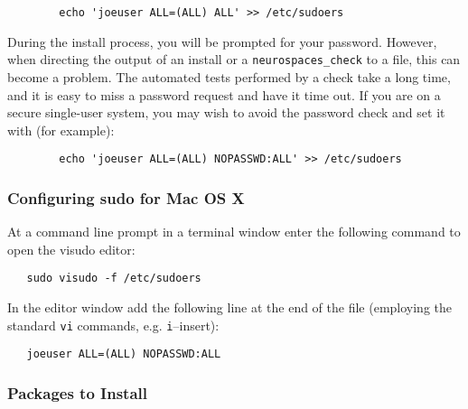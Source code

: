 \documentclass[12pt]{article}
\begin{document}
\begin{verbatim}
        echo 'joeuser ALL=(ALL) ALL' >> /etc/sudoers
\end{verbatim}

During the install process, you will be prompted for your password.
However, when directing the output of an install or a
{\tt neurospaces\_check} to a file, this can become a problem. The
automated tests performed by a check take a long time, and it is easy
to miss a password request and have it time out.  If you are on a
secure single-user system, you may wish to avoid the password check
and set it with (for example):

\begin{verbatim}
        echo 'joeuser ALL=(ALL) NOPASSWD:ALL' >> /etc/sudoers
\end{verbatim}

\subsubsection*{Configuring sudo for Mac OS X}

At a command line prompt in a terminal window enter the following command to open the visudo editor:

\begin{verbatim}
   sudo visudo -f /etc/sudoers
\end{verbatim}
In the editor window add the following line at the end of the file (employing the standard {\tt vi} commands, e.g. {\tt i}--insert):        
\begin{verbatim}
   joeuser ALL=(ALL) NOPASSWD:ALL
\end{verbatim}

\subsubsection*{Packages to Install}
\end{document}
